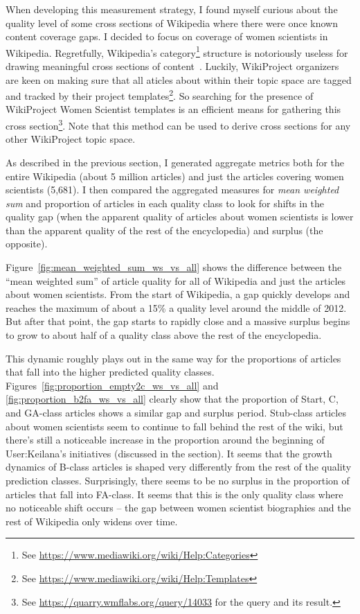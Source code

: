 When developing this measurement strategy, I found myself curious about the quality level of some cross sections of Wikipedia where there were once known content coverage gaps.  I decided to focus on coverage of women scientists in Wikipedia.  Regretfully, Wikipedia's category\footnote{See \url{https://www.mediawiki.org/wiki/Help:Categories}} structure is notoriously useless for drawing meaningful cross sections of content~\cite{kittur09what}.  Luckily, WikiProject organizers are keen on making sure that all aticles about within their topic space are tagged and tracked by their project templates\footnote{See \url{https://www.mediawiki.org/wiki/Help:Templates}}. So searching for the presence of WikiProject Women Scientist templates is an efficient means for gathering this cross section\footnote{See \url{https://quarry.wmflabs.org/query/14033} for the query and its result.}.  Note that this method can be used to derive cross sections for any other WikiProject topic space.

As described in the previous section, I generated aggregate metrics both for the entire Wikipedia (about 5 million articles) and just the articles covering women scientists (5,681).  I then compared the aggregated measures for \emph{mean weighted sum} and proportion of articles in each quality class to look for shifts in the quality gap (when the apparent quality of articles about women scientists is lower than the apparent quality of the rest of the encyclopedia) and surplus (the opposite).



Figure~\ref{fig:mean_weighted_sum_ws_vs_all} shows the difference between the ``mean weighted sum'' of article quality for all of Wikipedia and just the articles about women scientists.  From the start of Wikipedia, a gap quickly develops and reaches the maximum of about a 15\% a quality level around the middle of 2012.  But after that point, the gap starts to rapidly close and a massive surplus begins to grow to about half of a quality class above the rest of the encyclopedia.

This dynamic roughly plays out in the same way for the proportions of articles that fall into the higher predicted quality classes.  Figures~\ref{fig:proportion_empty2c_ws_vs_all} and \ref{fig:proportion_b2fa_ws_vs_all} clearly show that the proportion of Start, C, and GA-class articles shows a similar gap and surplus period.  Stub-class articles about women scientists seem to continue to fall behind the rest of the wiki, but there's still a noticeable increase in the proportion around the beginning of User:Keilana's initiatives (discussed in the  section).  It seems that the growth dynamics of B-class articles is shaped very differently from the rest of the quality prediction classes.  Surprisingly, there seems to be no surplus in the proportion of articles that fall into FA-class.  It seems that this is the only quality class where no noticeable shift occurs -- the gap between women scientist biographies and the rest of Wikipedia only widens over time.
